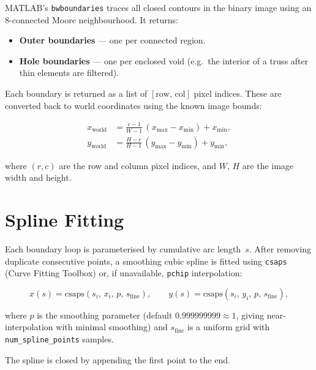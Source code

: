 MATLAB's \texttt{bwboundaries} traces all closed contours in the binary
image using an 8-connected Moore neighbourhood.  It returns:

\begin{itemize}[nosep]
    \item \textbf{Outer boundaries} --- one per connected region.
    \item \textbf{Hole boundaries} --- one per enclosed void (e.g.\ the
          interior of a truss after thin elements are filtered).
\end{itemize}

Each boundary is returned as a list of $[\text{row},\, \text{col}]$ pixel
indices.  These are converted back to world coordinates using the known
image bounds:

\begin{align}
    x_{\text{world}} &= \frac{c - 1}{W - 1}\,(x_{\max} - x_{\min}) + x_{\min}, \\[3pt]
    y_{\text{world}} &= \frac{H - r}{H - 1}\,(y_{\max} - y_{\min}) + y_{\min},
\end{align}

where $(r, c)$ are the row and column pixel indices, and $W$, $H$ are the
image width and height.

\section{Spline Fitting}
\label{sec:export:spline}

Each boundary loop is parameterised by cumulative arc length~$s$.  After
removing duplicate consecutive points, a smoothing cubic spline is fitted
using \texttt{csaps} (Curve Fitting Toolbox) or, if unavailable,
\texttt{pchip} interpolation:

\begin{equation}
    x(s) = \text{csaps}(s_i,\, x_i,\, p,\, s_{\text{fine}}), \qquad
    y(s) = \text{csaps}(s_i,\, y_i,\, p,\, s_{\text{fine}}),
\end{equation}

where $p$ is the smoothing parameter (default $0.999999999 \approx 1$,
giving near-interpolation with minimal smoothing) and $s_{\text{fine}}$ is
a uniform grid with \texttt{num\_spline\_points} samples.

The spline is closed by appending the first point to the end.

